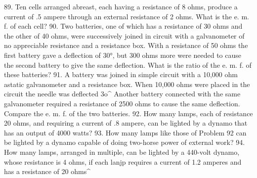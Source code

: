 89. Ten cells arranged abreast, each having a resistance of 8 ohms, produce a current of .5 ampere through an external resistance of 2 ohms. What is the e. m. f. of each cell?
90. Two batteries, one of which has a resistance of 30 ohms and the other of 40 ohms, were successively joined in circuit with a galvanometer of no appreciable resistance and a resistance box. With a resistance of 50 ohms the first battery gave a deflection of 30°, but 300 ohms more were needed to cause the second battery to give the same deflection. What is the ratio of the e. m. f. of these batteries?
91. A battery was joined in simple circuit with a 10,000 ohm astatic galvanometer and a resistance box. When 10,000 ohms were placed in the circuit the needle was deflected 3o^ Another battery connected with the same galvanometer required a resistance of 2500 ohms to cause the same deflection. Compare the e. m. f. of the two batteries.
92. How many lamps, each of resistance 20 ohms, and requiring a current of .8 ampere, can be lighted by a dynamo that has an output of 4000 watts?
93. How many lamps like those of Problem 92 can be lighted by a dynamo capable of doing two-horse power of external work?
94. How many lamps, arranged in multiple, can be lighted by a 440-volt dynamo, whose resistance is 4 ohms, if each lanjp requires a current of 1.2 amperes and has a resistance of 20 ohms^